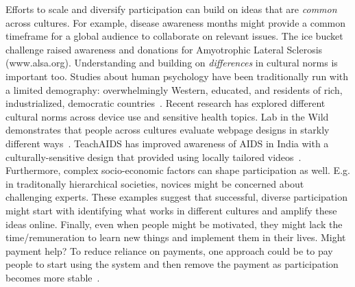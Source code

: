 Efforts to scale and diversify participation can build on ideas that are \textit{common} across cultures. For example, disease awareness months might provide a common timeframe for a global audience to collaborate on relevant issues. The ice bucket challenge raised awareness and donations for Amyotrophic Lateral Sclerosis (www.alsa.org). Understanding and building on \textit{differences} in cultural norms is important too. Studies about human psychology have been traditionally run with a limited demography: overwhelmingly Western, educated, and residents of rich, industrialized, democratic countries~\cite{Henrich2010a}. Recent research has explored different cultural norms across device use and sensitive health topics. Lab in the Wild demonstrates that people across cultures evaluate webpage designs in starkly different ways~\cite{Reinecke2014a}. TeachAIDS has improved awareness of AIDS in India with a culturally-sensitive design that provided using locally tailored videos~\cite{sorcar2009teaching}. Furthermore, complex socio-economic factors can shape participation as well. E.g. in traditonally hierarchical societies, novices might be concerned about challenging experts. These examples suggest that successful, diverse participation might start with identifying what works in different cultures and amplify these ideas online. Finally, even when people might be motivated, they might lack the time/remuneration to learn new things and implement them in their lives. Might payment help? To reduce reliance on payments, one approach could be to pay people to start using the system and then remove the payment as participation becomes more stable~\cite{Resnick2011}. 



